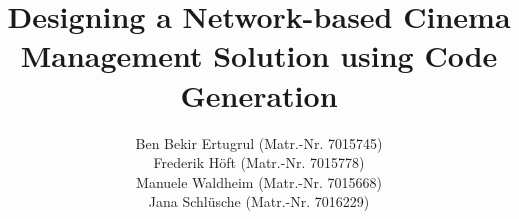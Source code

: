 \documentclass[praxisarbeit,english,oneside]{framework/hgbthesis}
\begin{document}

\title{Designing a Network-based Cinema Management Solution using Code Generation}
\prueferBack{} %
\author{{Ben Bekir Ertugrul (Matr.-Nr. 7015745)\texorpdfstring{\\}{ }Frederik Höft (Matr.-Nr. 7015778)\texorpdfstring{\\}{ }Manuele Waldheim (Matr.-Nr. 7015668)\texorpdfstring{\\}{ }Jana Schlüsche (Matr.-Nr. 7016229)}\texorpdfstring{\\}{ }}
\authorstreet{}
\authortown{}

\frontmatter
\maketitle



\listoftodos %

\\
\\
\\
\\




\inhaltsverzeichnis

\mainmatter         %








\end{document}
